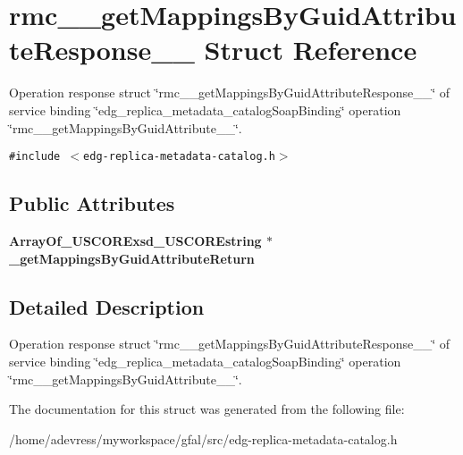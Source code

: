 \section{rmc\_\-\_\-get\-Mappings\-By\-Guid\-Attribute\-Response\_\-\_\- Struct Reference}
\label{structrmc____getMappingsByGuidAttributeResponse____}
Operation response struct \char`\"{}rmc\_\-\_\-get\-Mappings\-By\-Guid\-Attribute\-Response\_\-\_\-\char`\"{} of service binding \char`\"{}edg\_\-replica\_\-metadata\_\-catalog\-Soap\-Binding\char`\"{} operation \char`\"{}rmc\_\-\_\-get\-Mappings\-By\-Guid\-Attribute\_\-\_\-\char`\"{}.  


{\tt \#include $<$edg-replica-metadata-catalog.h$>$}

\subsection*{Public Attributes}
\begin{CompactItemize}
\item 
\bf{Array\-Of\_\-USCORExsd\_\-USCOREstring} $\ast$ \textbf{\_\-get\-Mappings\-By\-Guid\-Attribute\-Return}\label{structrmc____getMappingsByGuidAttributeResponse_____981fbee0bb47ccee6e195e2902eb7c76}

\end{CompactItemize}


\subsection{Detailed Description}
Operation response struct \char`\"{}rmc\_\-\_\-get\-Mappings\-By\-Guid\-Attribute\-Response\_\-\_\-\char`\"{} of service binding \char`\"{}edg\_\-replica\_\-metadata\_\-catalog\-Soap\-Binding\char`\"{} operation \char`\"{}rmc\_\-\_\-get\-Mappings\-By\-Guid\-Attribute\_\-\_\-\char`\"{}. 



The documentation for this struct was generated from the following file:\begin{CompactItemize}
\item 
/home/adevress/myworkspace/gfal/src/edg-replica-metadata-catalog.h\end{CompactItemize}
